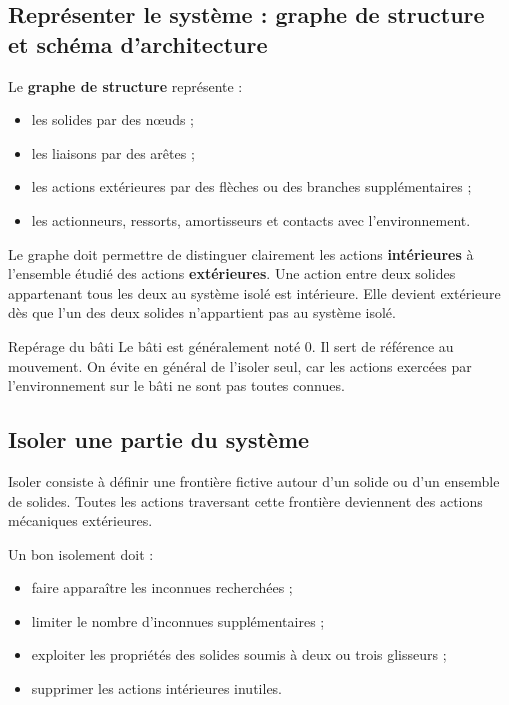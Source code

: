 \subsection{Représenter le système : graphe de structure et schéma d'architecture}

Le \textbf{graphe de structure} représente :
\begin{itemize}
  \item les solides par des nœuds ;
  \item les liaisons par des arêtes ;
  \item les actions extérieures par des flèches ou des branches supplémentaires ;
  \item les actionneurs, ressorts, amortisseurs et contacts avec l'environnement.
\end{itemize}

\TLGrapheStructureSimple

Le graphe doit permettre de distinguer clairement les actions \textbf{intérieures} à l'ensemble étudié des actions \textbf{extérieures}. Une action entre deux solides appartenant tous les deux au système isolé est intérieure. Elle devient extérieure dès que l'un des deux solides n'appartient pas au système isolé.

\begin{TLWarning}{Repérage du bâti}
Le bâti est généralement noté 0. Il sert de référence au mouvement. On évite en général de l'isoler seul, car les actions exercées par l'environnement sur le bâti ne sont pas toutes connues.
\end{TLWarning}

\subsection{Isoler une partie du système}

Isoler consiste à définir une frontière fictive autour d'un solide ou d'un ensemble de solides. Toutes les actions traversant cette frontière deviennent des actions mécaniques extérieures.

Un bon isolement doit :
\begin{itemize}
  \item faire apparaître les inconnues recherchées ;
  \item limiter le nombre d'inconnues supplémentaires ;
  \item exploiter les propriétés des solides soumis à deux ou trois glisseurs ;
  \item supprimer les actions intérieures inutiles.
\end{itemize}

